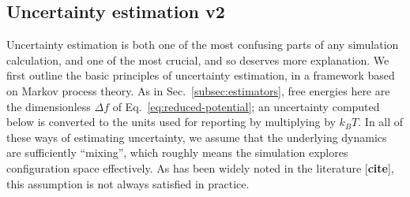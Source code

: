 


\subsection{Uncertainty estimation v2}
\label{subsec:uncertainty}

Uncertainty estimation is both one of the most confusing parts of any simulation calculation, and one of the most crucial, and so deserves more explanation. We first outline the basic principles of uncertainty estimation, in a framework based on Markov process theory. As in Sec.~\ref{subsec:estimators}, free energies here are the dimensionless $\Delta f$ of Eq.~\ref{eq:reduced-potential}; an uncertainty computed below is converted to the units used for reporting by multiplying by $k_B T$. In all of these ways of estimating uncertainty, we assume that the underlying dynamics are sufficiently ``mixing'', which roughly means the simulation explores configuration space effectively. As has been widely noted in the literature [\textbf{cite}], this assumption is not always satisfied in practice. 


